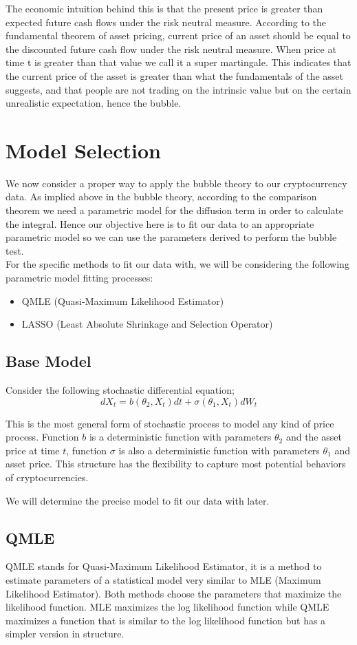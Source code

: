 \begin{spacing}{1.5}
The economic intuition behind this is that the present price is greater than expected future cash flows under the risk neutral measure. According to the fundamental theorem of asset pricing, current price of an asset should be equal to the discounted future cash flow under the risk neutral measure. When price at time t is greater than that value we call it a super martingale. This indicates that the current price of the asset is greater than what the fundamentals of the asset suggests, and that people are not trading on the intrinsic value but on the certain unrealistic expectation, hence the bubble.



\section{Model Selection}
We now consider a proper way to apply the bubble theory to our cryptocurrency data. As implied above in the bubble theory, according to the comparison theorem we need a parametric model for the diffusion term in order to calculate the integral. Hence our objective here is to fit our data to an appropriate parametric model so we can use the parameters derived to perform the bubble test.\\
For the specific methods to fit our data with, we will be considering the following parametric model fitting processes:
\begin{itemize}
\item QMLE (Quasi-Maximum Likelihood Estimator)
\item LASSO (Least Absolute Shrinkage and Selection Operator)
\end{itemize}
\subsection{Base Model}
Consider the following stochastic differential equation;
$$
dX_t = b(\theta_2,X_t)dt+\sigma(\theta_1,X_t)dW_t
$$

This is the most general form of stochastic process to model any kind of price process. Function $b$ is a deterministic function with parameters $\theta_2$ and the  asset price at time $t$, function $\sigma$ is also a deterministic function with parameters $\theta_1$ and asset price. This structure has the flexibility to capture most potential behaviors of cryptocurrencies.

We will determine the precise model to fit our data with later.

\subsection{QMLE}
QMLE stands for Quasi-Maximum Likelihood Estimator, it is a method to estimate parameters of a statistical model very similar to MLE
(Maximum Likelihood Estimator). Both methods choose the parameters that maximize the likelihood function. MLE maximizes the log likelihood function while QMLE maximizes a function that is similar to the log likelihood function but has a simpler version in structure.


\end{spacing}
